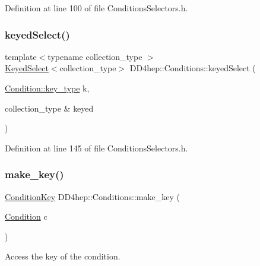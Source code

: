Definition at line 100 of file Conditions\+Selectors.\+h.

\hypertarget{namespace_d_d4hep_1_1_conditions_a4e9ef8a0bc2b4949f98d1a40814f9fd3}{}\label{namespace_d_d4hep_1_1_conditions_a4e9ef8a0bc2b4949f98d1a40814f9fd3} 
\subsubsection{\texorpdfstring{keyed\+Select()}{keyedSelect()}}
{\footnotesize\ttfamily template$<$typename collection\+\_\+type $>$ \\
\hyperlink{class_d_d4hep_1_1_conditions_1_1_keyed_select}{Keyed\+Select}$<$collection\+\_\+type$>$ D\+D4hep\+::\+Conditions\+::keyed\+Select (\begin{DoxyParamCaption}\item[{\hyperlink{class_d_d4hep_1_1_conditions_1_1_condition_a7528efa762e8cc072ef80ea67c3531f9}{Condition\+::key\+\_\+type}}]{k,  }\item[{collection\+\_\+type \&}]{keyed }\end{DoxyParamCaption})}



Definition at line 145 of file Conditions\+Selectors.\+h.

\hypertarget{namespace_d_d4hep_1_1_conditions_a5d280367b77508df52c5caadc9d84abf}{}\label{namespace_d_d4hep_1_1_conditions_a5d280367b77508df52c5caadc9d84abf} 
\subsubsection{\texorpdfstring{make\+\_\+key()}{make\_key()}}
{\footnotesize\ttfamily \hyperlink{class_d_d4hep_1_1_conditions_1_1_condition_key}{Condition\+Key} D\+D4hep\+::\+Conditions\+::make\+\_\+key (\begin{DoxyParamCaption}\item[{\hyperlink{class_d_d4hep_1_1_conditions_1_1_condition}{Condition}}]{c }\end{DoxyParamCaption})}



Access the key of the condition. 



